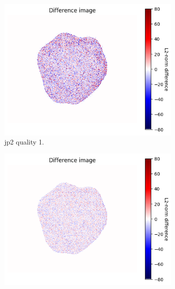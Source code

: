 \begin{figure}[htb]
    \centering
        \begin{subfigure}[b]{0.49\textwidth}
            \centering
            \includegraphics[width=\textwidth]{doc/thesis/0_figures/compare_quality/set1/heatmap/jp2_1_diff_heatmap.png}
            \caption{\gls{jp2} quality 1.}
            \label{fig:img_quality_heatmap_1}
        \end{subfigure}
        \begin{subfigure}[b]{0.49\textwidth}
            \centering
            \includegraphics[width=\textwidth]{doc/thesis/0_figures/compare_quality/set1/heatmap/jp2_5_diff_heatmap.png}

\end{subfigure}
\end{figure}
